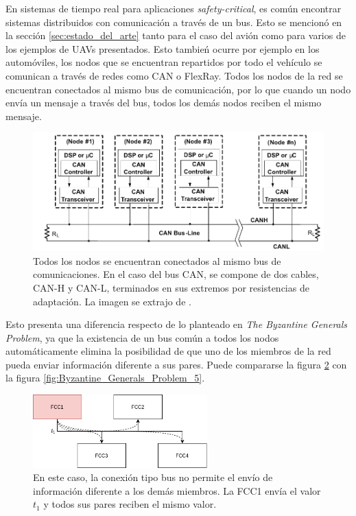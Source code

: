En sistemas de tiempo real para aplicaciones \textit{safety-critical}, es común encontrar sistemas distribuidos con comunicación a través de un bus. Esto se mencionó en la sección \ref{sec:estado_del_arte} tanto para el caso del avión como para varios de los ejemplos de UAVs presentados. Esto tambień ocurre por ejemplo en los automóviles, los nodos que se encuentran repartidos por todo el vehículo se comunican a través de redes como CAN\cite{specification1991bosch} o FlexRay\cite{nxpAN12233}. Todos los nodos de la red se encuentran conectados al mismo bus de comunicación, por lo que cuando un nodo envía un mensaje a través del bus, todos los demás nodos reciben el mismo mensaje.

\begin{figure}[H]
    \centering
    \includegraphics[width=\textwidth]{img/red_CAN.png}
    \caption{Todos los nodos se encuentran conectados al mismo bus de comunicaciones. En el caso del bus CAN, se compone de dos cables, CAN-H y CAN-L, terminados en sus extremos por resistencias de adaptación. La imagen se extrajo de \cite{texasSLOA101B}.}
    \label{fig:red_CAN}
\end{figure}

Esto presenta una diferencia respecto de lo planteado en \textit{The Byzantine Generals Problem}, ya que la existencia de un bus común a todos los nodos automáticamente elimina la posibilidad de que uno de los miembros de la red pueda enviar información diferente a sus pares. Puede compararse la figura \ref{fig:byzantine_bus_1} con la figura \ref{fig:Byzantine_Generals_Problem_5}.

\begin{figure}[H]
    \centering
    \includegraphics[width=0.6\textwidth]{img/byzantine_bus_1.png}
    \caption{En este caso, la conexión tipo bus no permite el envío de información diferente a los demás miembros. La FCC1 envía el valor $t_1$ y todos sus pares reciben el mismo valor.}
    \label{fig:byzantine_bus_1}    
\end{figure}

